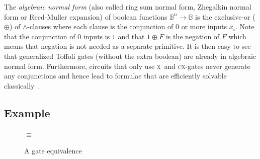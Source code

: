 \documentclass[sigplan,screen]{acmart}
\newcommand{\x}{\textsc{x}}
\newcommand{\cx}{\textsc{cx}}
\newcommand{\Bool}{\ensuremath{\mathbb{B}}}
\theoremstyle{definition}
\begin{document}
The \emph{algebraic normal form} (also called ring sum normal form,
Zhegalkin normal form or Reed-Muller expansion) of boolean functions
$\Bool^n\rightarrow\Bool$ is the exclusive-or ($\oplus$) of
$\wedge$-clauses where each clause is the conjunction of 0 or more
inputs $x_i$. Note that the conjunction of $0$ inputs is $1$ and that
$1 \oplus F$ is the negation of $F$ which means that negation is not
needed as a separate primitive. It is then easy to see that
generalized Toffoli gates (without the extra boolean) are already in
algebraic normal form.  Furthermore, circuits that only use \x\ and
\cx-gates never generate any conjunctions and hence lead to formulae
that are efficiently solvable
classically~\cite{10.5555/35517,TOKAREVA20151}.

\subsection{Example}

\begin{figure}[t]
  \centering
\begin{subfigure}[c]{.25\textwidth}
    \centering
\end{subfigure}
\qquad$\equiv$\qquad
\begin{subfigure}[c]{.25\textwidth}
    \centering
 \end{subfigure}
\caption{\label{fig:cnotopt}A gate equivalence}
\end{figure}
\end{document}
